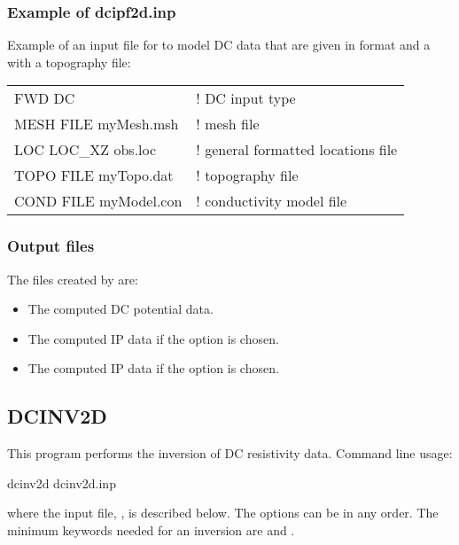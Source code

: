 \subsubsection*{Example of dcipf2d.inp}
Example of an input file for  to model DC data that are given in  format and a with a topography file:
\begin{fileExample}
\begin{tabular}{|ll|}
\hline
FWD DC & ! DC input type \\
MESH FILE myMesh.msh & ! mesh file \\
LOC LOC\_XZ obs.loc & ! general formatted locations file \\
TOPO FILE myTopo.dat & ! topography file \\
COND FILE myModel.con & ! conductivity model file \\
\hline
\end{tabular}
\end{fileExample}

\subsubsection{Output files}
The files created by  are:
\begin{itemize}
\item[\fileName{obs\_dc.dat}] The computed DC potential data.
\item[\fileName{obs\_ip.dat}] The computed IP data if the option  is chosen.
\item[\fileName{obs\_ipL.dat}] The computed IP data if the option  is chosen.
\end{itemize}

\subsection{DCINV2D}
This program performs the inversion of DC resistivity data. Command line usage:

\begin{fileExample}
dcinv2d dcinv2d.inp
\end{fileExample}
%
where the input file, , is described below. The options can be in any order. The minimum keywords needed for an inversion are  and .

